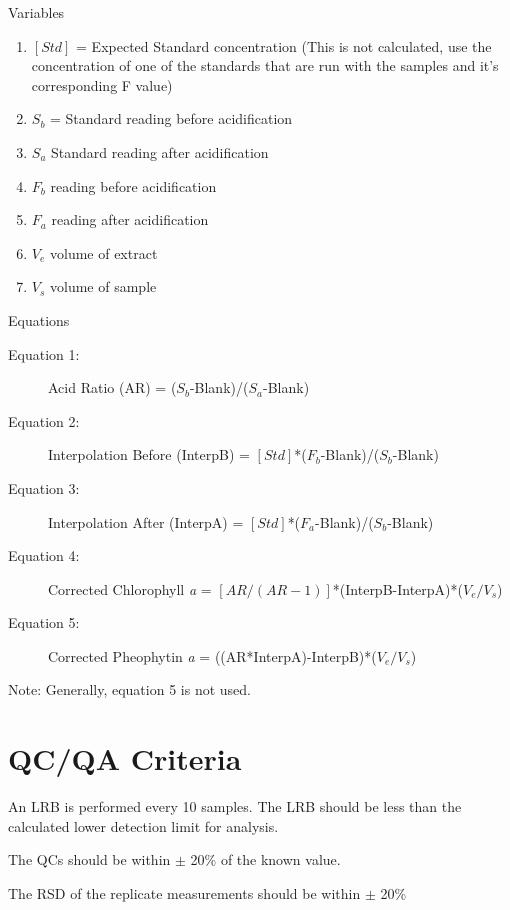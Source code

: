 \documentclass[12pt]{../SOP3_alpha}
\begin{document}
\NP Variables
\begin{enumerate}
\item $[Std]$ = Expected Standard concentration (This is not calculated, use the concentration of one of the standards that are run with the samples and it's corresponding F value)
\item $S_b$ = Standard reading before acidification
\item $S_a$ Standard reading after acidification
\item $F_b$ reading before acidification
\item $F_a$ reading after acidification
\item $V_e$ volume of extract
\item $V_s$ volume of sample 
\end{enumerate}

\NP Equations
\begin{description}
\item[Equation 1:] Acid Ratio (AR) = ($S_b$-Blank)/($S_a$-Blank)
\item[Equation 2:] Interpolation Before (InterpB) = $[Std]$*($F_b$-Blank)/($S_b$-Blank)
\item[Equation 3:] Interpolation After (InterpA) = $[Std]$*($F_a$-Blank)/($S_b$-Blank)
\item[Equation 4:] Corrected Chlorophyll \textit{a} = $[AR/(AR-1)]$*(InterpB-InterpA)*($V_e/V_s$)
\item[Equation 5:] Corrected Pheophytin \textit{a} = ((AR*InterpA)-InterpB)*($V_e/V_s$)
\end{description}
Note: Generally, equation 5 is not used. 

\section{QC/QA Criteria}

\NP An LRB is performed every 10 samples. The LRB should be less than the calculated lower detection limit for analysis.

\NP The QCs should be within $\pm$ 20\% of the known value. 

\NP The RSD of the replicate measurements should be within $\pm$ 20\%
\end{document}
